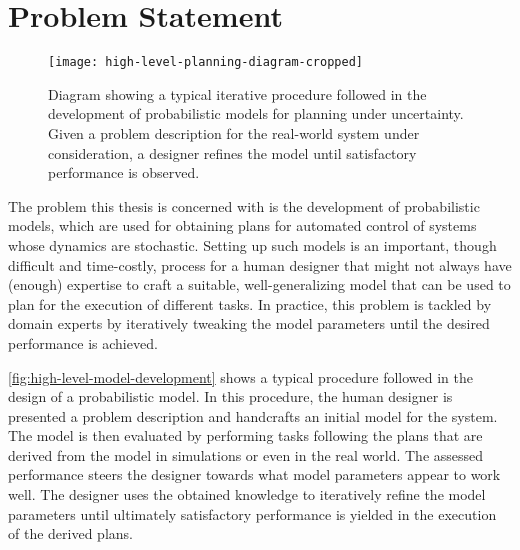 
\section{Problem Statement}
\label{sec:problem-description}

\begin{figure}[t]
	\centering
	\texttt{[image: high-level-planning-diagram-cropped]}
	\caption{Diagram showing a typical iterative procedure followed in the development of probabilistic models for planning under uncertainty. Given a problem description for the real-world system under consideration, a designer refines the model until satisfactory performance is observed.}
	\label{fig:high-level-model-development}
	\vspace{-4pt} %
\end{figure}

The problem this thesis is concerned with is the development of probabilistic models, which are used for obtaining plans for automated control of systems whose dynamics are stochastic.
Setting up such models is an important, though difficult and time-costly, process for a human designer that might not always have (enough) expertise to craft a suitable, well-generalizing model that can be used to plan for the execution of different tasks.
In practice, this problem is tackled by domain experts by iteratively tweaking the model parameters until the desired performance is achieved.

\autoref{fig:high-level-model-development} shows a typical procedure followed in the design of a probabilistic model.
In this procedure, the human designer is presented a problem description and handcrafts an initial model for the system.
The model is then evaluated by performing tasks following the plans that are derived from the model in simulations or even in the real world.
The assessed performance steers the designer towards what model parameters appear to work well.
The designer uses the obtained knowledge to iteratively refine the model parameters until ultimately satisfactory performance is yielded in the execution of the derived plans.

